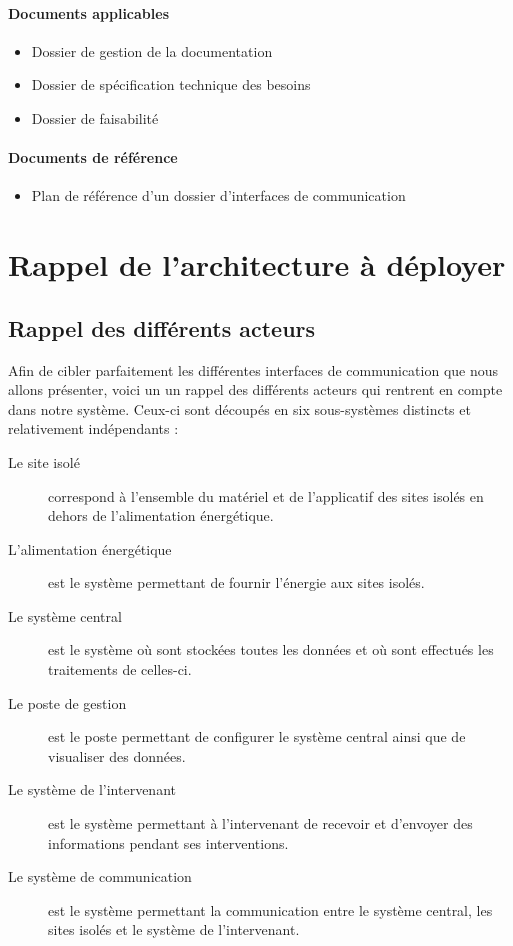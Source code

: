\documentclass[a4paper, 11pt, final]{article}
\begin{document}
\paragraph{Documents applicables}
\begin{itemize}
\item Dossier de gestion de la documentation
\item Dossier de spécification technique des besoins
\item Dossier de faisabilité
\end{itemize}

\paragraph{Documents de référence}
\begin{itemize}
\item Plan de référence d'un dossier d'interfaces de communication
\end{itemize}


\section{Rappel de l'architecture à déployer}

\subsection{Rappel des différents acteurs}
    Afin de cibler parfaitement les différentes interfaces de communication que
nous allons présenter, voici un un rappel des différents acteurs qui rentrent en
compte dans notre système. Ceux-ci sont découpés en six sous-systèmes distincts
et relativement indépendants :

\begin{description}
    \item[Le site isolé] correspond à l'ensemble du matériel et de
    l'applicatif des sites isolés en dehors de l'alimentation énergétique.
    \item[L'alimentation énergétique] est le système permettant de fournir
    l'énergie aux sites isolés.
    \item[Le système central] est le système où sont stockées toutes les données
    et où sont effectués les traitements de celles-ci.
    \item[Le poste de gestion] est le poste permettant de configurer le système
    central ainsi que de visualiser des données.
    \item[Le système de l'intervenant] est le système permettant à l'intervenant
    de recevoir et d'envoyer des informations pendant ses interventions.
    \item[Le système de communication] est le système permettant la communication
    entre le système central, les sites isolés et le système de l'intervenant.
\end{description}
\end{document}
